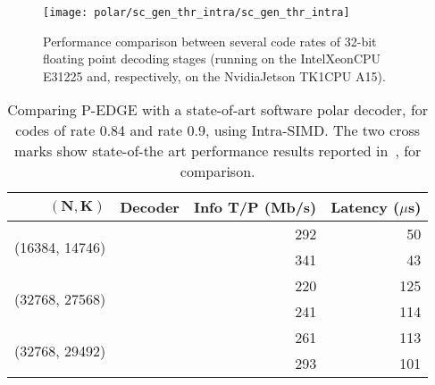 \begin{figure}[htp]
  \texttt{[image: polar/sc\_gen\_thr\_intra/sc\_gen\_thr\_intra]}
  \caption{Performance comparison between several code rates of 32-bit floating
    point decoding stages (running on the Intel\R Xeon\TM CPU E31225 and,
    respectively, on the Nvidia\R Jetson TK1\TM CPU A15).}
  \label{plot:eval_polar_sc_gen_thr_intra}
\end{figure}

\begin{table}[htp]
  \begin{center}
  \begin{tabular}{r  r  r  r}
    $\bm{(N, K)}$                   & \textbf{Decoder}     & \textbf{Info T/P} (Mb/s) & \textbf{Latency} ($\mu$s)\\
    \hline
    \hline
    \multirow{2}{*}{(16384, 14746)} & \cite{Sarkis2014}    & 292                      & 50              \\
                                    & \cite{Cassagne2015c} & 341                      & 43              \\
    \hline
    \multirow{2}{*}{(32768, 27568)} & \cite{Sarkis2014}    & 220                      & 125             \\
                                    & \cite{Cassagne2015c} & 241                      & 114             \\
    \hline
    \multirow{2}{*}{(32768, 29492)} & \cite{Sarkis2014}    & 261                      & 113             \\
                                    & \cite{Cassagne2015c} & 293                      & 101             \\
  \end{tabular}
  \end{center}
  \caption{Comparing P-EDGE with a state-of-art software polar decoder, for
    codes of rate 0.84 and rate 0.9, using Intra-SIMD. The two cross marks show
    state-of-the art performance results reported in~\cite{Sarkis2014}, for
    comparison.}
  \label{tab:eval_polar_sc_gen_thr_comparison}
\end{table}

